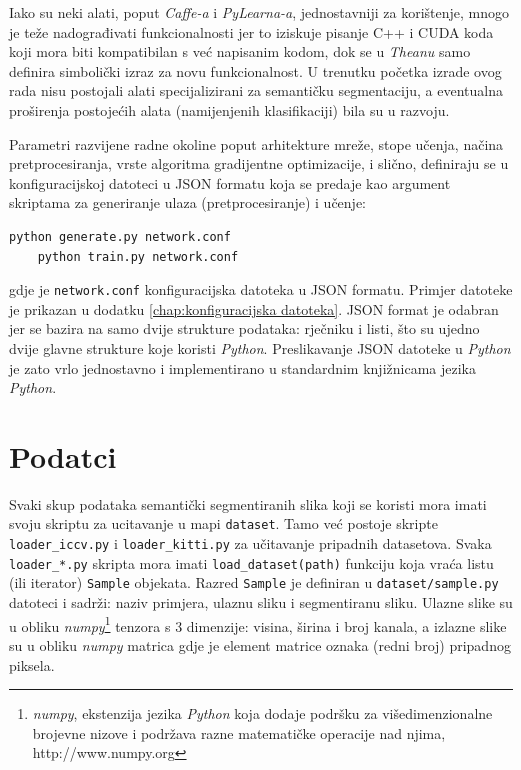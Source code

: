 \documentclass[times, utf8, diplomski, numeric]{fer}
\begin{document}
Iako su neki alati, poput \textit{Caffe-a} i \textit{PyLearna-a}, jednostavniji za korištenje, mnogo je teže nadograđivati funkcionalnosti jer to iziskuje pisanje C++ i CUDA koda koji mora biti kompatibilan s već napisanim kodom, dok se u \textit{Theanu} samo definira simbolički izraz za novu funkcionalnost. U trenutku početka izrade ovog rada nisu postojali alati specijalizirani za semantičku segmentaciju, a eventualna proširenja postojećih alata (namijenjenih klasifikaciji) bila su u razvoju.

Parametri razvijene radne okoline poput arhitekture mreže, stope učenja, načina pretprocesiranja, vrste algoritma gradijentne optimizacije, i slično, definiraju se u konfiguracijskoj datoteci u JSON formatu koja se predaje kao argument skriptama za generiranje ulaza (pretprocesiranje) i učenje:
\begin{lstlisting}[language=bash]
    python generate.py network.conf
    python train.py network.conf
\end{lstlisting}
gdje je \texttt{network.conf} konfiguracijska datoteka u JSON formatu. Primjer datoteke je prikazan u dodatku \ref{chap:konfiguracijska datoteka}. JSON format je odabran jer se bazira na samo dvije strukture podataka: rječniku i listi, što su ujedno dvije glavne strukture koje koristi \textit{Python}. Preslikavanje JSON datoteke u \textit{Python} je zato vrlo jednostavno i implementirano u standardnim knjižnicama jezika \textit{Python}.

\section{Podatci}
Svaki skup podataka semantički segmentiranih slika koji se koristi mora imati svoju skriptu za ucitavanje u mapi \texttt{dataset}. Tamo već postoje skripte \texttt{loader\_iccv.py} i \texttt{loader\_kitti.py} za učitavanje pripadnih datasetova. Svaka \texttt{loader\_*.py} skripta mora imati \texttt{load\_dataset(path)} funkciju koja vraća listu (ili iterator) \texttt{Sample} objekata. Razred \texttt{Sample} je definiran u \texttt{dataset/sample.py} datoteci i sadrži: naziv primjera, ulaznu sliku i segmentiranu sliku. Ulazne slike su u obliku \emph{numpy}\footnote{\textit{numpy}, ekstenzija jezika \textit{Python} koja dodaje podršku za višedimenzionalne brojevne nizove i podržava razne matematičke operacije nad njima, http://www.numpy.org} tenzora s 3 dimenzije: visina, širina i broj kanala, a izlazne slike su u obliku \emph{numpy} matrica gdje je element matrice oznaka (redni broj) pripadnog piksela.
\end{document}
